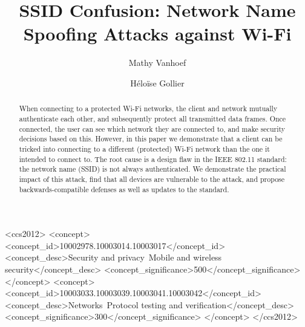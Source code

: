 \documentclass[sigconf,review]{acmart}
\newcommand{\wifi}{\mbox{Wi-Fi}}
\begin{document}
\title{SSID Confusion: Network Name Spoofing Attacks against \wifi{}}

\author{Mathy Vanhoef}

\author{Héloïse Gollier}

\renewcommand{\shortauthors}{Mathy Vanhoef, Xianjun Jiao, Wei Liu \& Ingrid Moerman}

\begin{CCSXML}
<ccs2012>
   <concept>
       <concept_id>10002978.10003014.10003017</concept_id>
       <concept_desc>Security and privacy~Mobile and wireless security</concept_desc>
       <concept_significance>500</concept_significance>
       </concept>
   <concept>
       <concept_id>10003033.10003039.10003041.10003042</concept_id>
       <concept_desc>Networks~Protocol testing and verification</concept_desc>
       <concept_significance>300</concept_significance>
       </concept>
 </ccs2012>
\end{CCSXML}





\begin{abstract}
When connecting to a protected \wifi{} networks, the client and network mutually authenticate each other, and subsequently protect all transmitted data frames.
Once connected, the user can see which network they are connected to, and make security decisions based on this.
However, in this paper we demonstrate that a client can be tricked into connecting to a different (protected) \wifi{} network than the one it intended to connect to.
The root cause is a design flaw in the IEEE 802.11 standard: the network name (SSID) is not always authenticated.
We demonstrate the practical impact of this attack, find that all devices are vulnerable to the attack, and propose backwards-compatible defenses as well as updates to the standard.
\end{abstract}
\end{document}
